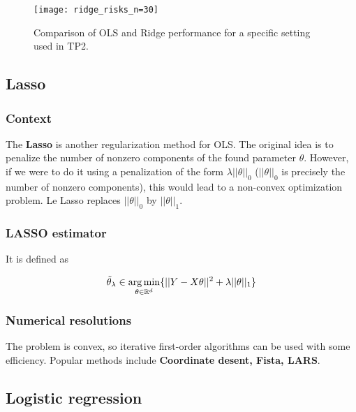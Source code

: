 \documentclass[
10pt, %
a4paper, %
oneside, %
headinclude,footinclude, %
BCOR5mm, %
]{scrartcl}
\begin{document}
\begin{figure}[htpb]
    \centering
    \texttt{[image: ridge\_risks\_n=30]}
    \caption{Comparison of OLS and Ridge performance for a specific setting
    used in TP2.}
    \label{fig:ridge_risks_n=30}
\end{figure}

\subsection{\large\color{MidnightBlue}Lasso}

\subsubsection{\large\color{Periwinkle}Context}

The \textbf{{Lasso}}  is another regularization method for OLS. The original idea is to penalize the number of nonzero components of the found parameter $\theta$. However, if we were to do it using a penalization of the form $\lambda||\theta||_0$ ($||\theta||_0$ is precisely the number of nonzero components), this would lead to a non-convex optimization problem. Le Lasso replaces $||\theta||_0$ by $ ||\theta||_1$.

\subsubsection{\large\color{Periwinkle}LASSO estimator}

It is defined as

\begin{equation}
    \tilde{\theta}_{\lambda}\in \operatorname*{arg\,min}_{\theta\in \mathbb{R}^d}\{||Y-X\theta||^2+\lambda ||\theta||_1\}
\end{equation}

\subsubsection{\large\color{Periwinkle}Numerical resolutions}

The problem is convex, so iterative first-order algorithms can be used with some efficiency. Popular methods include \textbf{{Coordinate desent, Fista, LARS}}.

\subsection{\large\color{MidnightBlue}Logistic regression}
\label{subsec:logistic}
\end{document}
